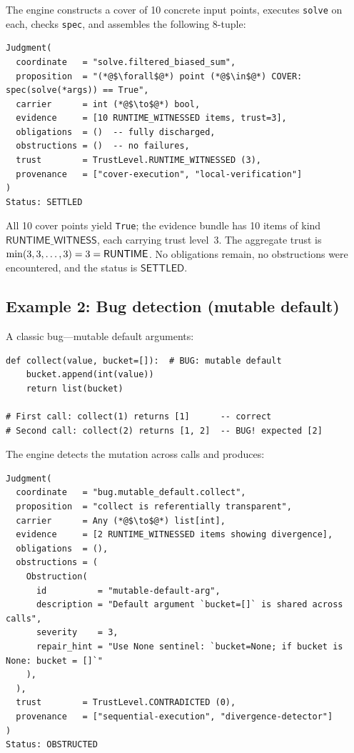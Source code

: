 \documentclass[11pt]{article}
\begin{document}
The \JuGeo{} engine constructs a cover of 10 concrete input points,
executes \texttt{solve} on each, checks \texttt{spec}, and assembles the
following 8-tuple:

\begin{lstlisting}[style=jugeo-output,
  caption={Full 8-tuple for affine-sum specification satisfaction.}]
Judgment(
  coordinate   = "solve.filtered_biased_sum",
  proposition  = "(*@$\forall$@*) point (*@$\in$@*) COVER: spec(solve(*args)) == True",
  carrier      = int (*@$\to$@*) bool,
  evidence     = [10 RUNTIME_WITNESSED items, trust=3],
  obligations  = ()  -- fully discharged,
  obstructions = ()  -- no failures,
  trust        = TrustLevel.RUNTIME_WITNESSED (3),
  provenance   = ["cover-execution", "local-verification"]
)
Status: SETTLED
\end{lstlisting}

All 10 cover points yield \texttt{True}; the evidence bundle has 10 items
of kind $\mathsf{RUNTIME\_WITNESS}$, each carrying trust level~3.  The
aggregate trust is $\min(3,3,\ldots,3) = 3 = \mathsf{RUNTIME}$.  No obligations
remain, no obstructions were encountered, and the status is
$\mathsf{SETTLED}$.

\subsection{Example 2: Bug detection (mutable default)}

A classic \Python{} bug---mutable default arguments:

\begin{lstlisting}[caption={Mutable default argument bug.}]
def collect(value, bucket=[]):  # BUG: mutable default
    bucket.append(int(value))
    return list(bucket)

# First call: collect(1) returns [1]      -- correct
# Second call: collect(2) returns [1, 2]  -- BUG! expected [2]
\end{lstlisting}

The \JuGeo{} engine detects the mutation across calls and produces:

\begin{lstlisting}[style=jugeo-output,
  caption={Obstructed judgment for mutable-default bug.}]
Judgment(
  coordinate   = "bug.mutable_default.collect",
  proposition  = "collect is referentially transparent",
  carrier      = Any (*@$\to$@*) list[int],
  evidence     = [2 RUNTIME_WITNESSED items showing divergence],
  obligations  = (),
  obstructions = (
    Obstruction(
      id          = "mutable-default-arg",
      description = "Default argument `bucket=[]` is shared across calls",
      severity    = 3,
      repair_hint = "Use None sentinel: `bucket=None; if bucket is None: bucket = []`"
    ),
  ),
  trust        = TrustLevel.CONTRADICTED (0),
  provenance   = ["sequential-execution", "divergence-detector"]
)
Status: OBSTRUCTED
\end{lstlisting}
\end{document}
